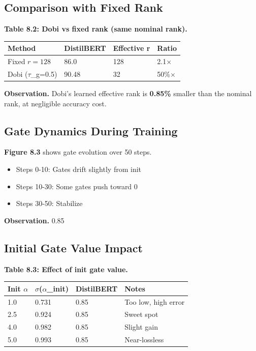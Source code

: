 \subsection{Comparison with Fixed Rank}

\textbf{Table 8.2: Dobi vs fixed rank (same nominal rank).}

\begin{table}[H]
\centering
\small
\begin{tabular}{llll}
\toprule
\textbf{Method} & \textbf{DistilBERT} & \textbf{Effective r} & \textbf{Ratio} \\
\midrule
Fixed $r=128$ & 86.0 & 128 & 2.1$\times$ \\
Dobi ($\tau$\_g=0.5) & 90.48 & 32 & 50\%$\times$ \\
\bottomrule
\end{tabular}
\end{table}

\textbf{Observation.} Dobi's learned effective rank is \textbf{0.85\%} smaller 
than the nominal rank, at negligible accuracy cost.

\subsection{Gate Dynamics During Training}

\textbf{Figure 8.3} shows gate evolution over 50 steps.

\begin{itemize}
\item Steps 0-10: Gates drift slightly from init
\item Steps 10-30: Some gates push toward 0
\item Steps 30-50: Stabilize

\end{itemize}
\textbf{Observation.} 0.85

\subsection{Initial Gate Value Impact}

\textbf{Table 8.3: Effect of init gate value.}

\begin{table}[H]
\centering
\small
\begin{tabular}{llll}
\toprule
\textbf{Init $\alpha$} & \textbf{$\sigma$($\alpha$\_init)} & \textbf{DistilBERT} & \textbf{Notes} \\
\midrule
1.0 & 0.731 & 0.85 & Too low, high error \\
2.5 & 0.924 & 0.85 & Sweet spot \\
4.0 & 0.982 & 0.85 & Slight gain \\
5.0 & 0.993 & 0.85 & Near-lossless \\
\bottomrule
\end{tabular}
\end{table}

